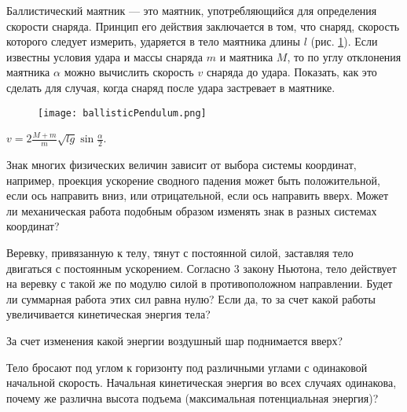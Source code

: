 \begin{ex} %
Баллистический маятник — это маятник, употребляющийся для определения скорости снаряда. Принцип его действия заключается в том, что снаряд, скорость которого следует измерить, ударяется в тело маятника длины $l$ (рис. \ref{ballisticPendulum}). Если известны условия удара и массы снаряда $m$ и маятника $M$, то по углу отклонения маятника $\alpha$ можно вычислить скорость $v$ снаряда до удара. Показать, как это сделать для случая, когда снаряд после удара застревает в маятнике.

\begin{figure}[h]
\centering
\texttt{[image: ballisticPendulum.png]}
\caption{}
\label{ballisticPendulum}
\end{figure}

\begin{ans}
$v = 2\frac{M+m}{m}\sqrt{lg}\sin \frac{\alpha}{2}$.
\end{ans}
\end{ex}

\qualProblems

\begin{ex}
Знак многих физических величин зависит от выбора системы координат, например, проекция ускорение сводного падения может быть положительной, если ось направить вниз, или отрицательной, если ось направить вверх. Может ли механическая работа подобным образом изменять знак в разных системах координат?
\end{ex}

\begin{ex}
Веревку, привязанную к телу, тянут с постоянной силой, заставляя тело двигаться с постоянным ускорением. Согласно 3 закону Ньютона, тело действует на веревку с такой же по модулю силой в противоположном направлении. Будет ли суммарная работа этих сил равна нулю? Если да, то за счет какой работы увеличивается кинетическая энергия тела? 
\end{ex}

\begin{ex}
За счет изменения какой энергии воздушный шар поднимается вверх?
\end{ex}

\begin{ex}
Тело бросают под углом к горизонту под различными углами с одинаковой начальной скорость. Начальная кинетическая энергия во всех случаях одинакова, почему же различна высота подъема (максимальная потенциальная энергия)?
\end{ex}

